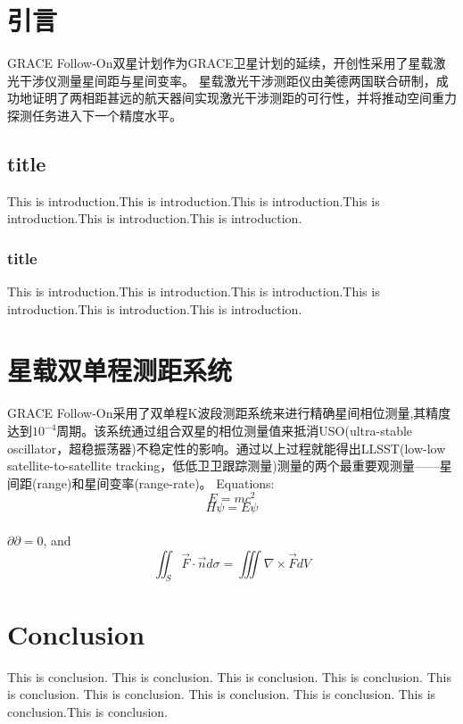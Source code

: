 \documentclass[hyperref]{ctexart}
\begin{document}
    \begin{multicols}{2}
    \section{引言}
    GRACE Follow-On双星计划作为GRACE卫星计划的延续，开创性采用了星载激光干涉仪测量星间距与星间变率。
    星载激光干涉测距仪由美德两国联合研制，成功地证明了两相距甚远的航天器间实现激光干涉测距的可行性，并将推动空间重力探测任务进入下一个精度水平。
    \subsection{title}
    This is introduction.This is introduction.This is introduction.This is introduction.This is introduction.This is introduction.
    \subsubsection{title}
    This is introduction.This is introduction.This is introduction.This is introduction.This is introduction.This is introduction.
    \section{星载双单程测距系统}
    GRACE Follow-On采用了双单程K波段测距系统来进行精确星间相位测量,其精度达到$10^{-4}$周期\cite{kornfeldGRACEFOGravityRecovery2019}。该系统通过组合双星的相位测量值来抵消USO(ultra-stable oscillator，超稳振荡器)不稳定性的影响。通过以上过程就能得出LLSST(low-low satellite-to-satellite tracking，低低卫卫跟踪测量)测量的两个最重要观测量——星间距(range)和星间变率(range-rate)。
    \noindent Equations: 
    \begin{equation}
        E=mc^2
    \end{equation}
    \begin{equation}
        H\psi=E\psi
    \end{equation}\\
    $\partial\partial=0$, and
    $$\iint_S \vec{F}\cdot \vec{n}d\sigma=\iiint \nabla\times\vec{F}dV$$
    \section{Conclusion}
    This is conclusion. This is conclusion. This is conclusion. This is conclusion. This is conclusion. This is conclusion. This is conclusion. This is conclusion. This is conclusion.This is conclusion.

\end{multicols}
\end{document}
